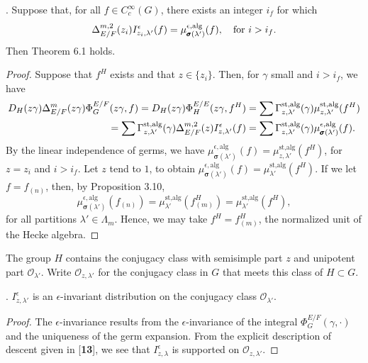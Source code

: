\documentclass{amsart}
\begin{document}
.  
Suppose that, for all $f\in C_c^\infty (G)$, there exists
an integer $i_f$ for which
$$\Delta^{m,2}_{E/F}(z_i)I^{\epsilon}_{z_i,\lambda'}(f)
	= \mu^{\epsilon,\text{alg}}_{\pmb\sigma(\lambda')}(f),\ \ \text{ for }
	i>i_f.\hss$$
Then Theorem 6.1 holds.
\finishproclaim

\begin{proof}  Suppose that $f^H$ exists and that $z\in \{z_i\}$.
Then, for $\gamma$ small and $i>i_f$, we have
\begin{align*}
D_H(z\gamma)\Delta^m_{E/F}(z\gamma)\Phi^{E/F}_G(z\gamma,f) =
	D_H(z\gamma)\Phi^{E/E}_H(z\gamma,f^H) &= 
 	\sum\Gamma^{\text{st,alg}}_{z,\lambda'}(\gamma)\mu^{\text{st,alg}}_
	{z,\lambda'}(f^H)\\
	\vspace{8pt}
	= \sum\Gamma^{\text{st,alg}}_{z,\lambda'}(\gamma)
	\Delta^{m,2}_{E/F}(z)
	I^{\epsilon}_{z,\lambda'}(f) &= \sum\Gamma^{\text{st,alg}}_
	{z,\lambda'}(\gamma)\mu^{\epsilon,\text{alg}}_{\pmb\sigma(\lambda')}
	(f).
\end{align*}
By the linear independence of germs, we have  $\mu^{\epsilon,\text{alg}}_%
	{\pmb\sigma(\lambda')}(f)
	=\mu^{\text{st,alg}}_{z,\lambda'}(f^H)$, for $z=z_i$ and $i>i_f$.
Let $z$ tend to $1$, to obtain $\mu^{\epsilon,{\text{alg}}}_{\pmb\sigma(\lambda')}
(f) = \mu^{\text{st,alg}}_{\lambda'}(f^H)$.  If we let $f=f_{(n)}$,
then, by Proposition 3.10,
$$\mu^{\epsilon,{\text{alg}}}_{\pmb\sigma(\lambda')}(f_{(n)}) =
  \mu^{\text{st,alg}}_{\lambda'}(f^H_{(m)}) = 
  \mu^{\text{st,alg}}_{\lambda'}(f^H),$$
for all partitions $\lambda'\in \Lambda_m$.  Hence, we may
take $f^H = f^H_{(m)}$, the normalized unit of the Hecke algebra.
\end{proof}

The group $H$ contains the conjugacy class with semisimple part $z$ and
unipotent part ${\mathcal O}_{\lambda'}$.  Write ${\mathcal O}_{z,\lambda'}$ for
the conjugacy class in $G$ that meets this class of $H\subset G$.

.  $I^{\epsilon}_{z,\lambda'}$ is an
$\epsilon$-invariant distribution on the conjugacy class ${\mathcal O}_{\lambda'}$.
\finishproclaim

\begin{proof}  The $\epsilon$-invariance results from the
$\epsilon$-invariance of the integral $\Phi^{E/F}_G(\gamma,\cdot)$
and the uniqueness of the germ expansion.  From the explicit description
of descent given in [{\bf 13}], we see that $I^{\epsilon}_{z,\lambda}$
is supported on ${\mathcal O}_{z,\lambda'}$.
\end{proof}
\end{document}
